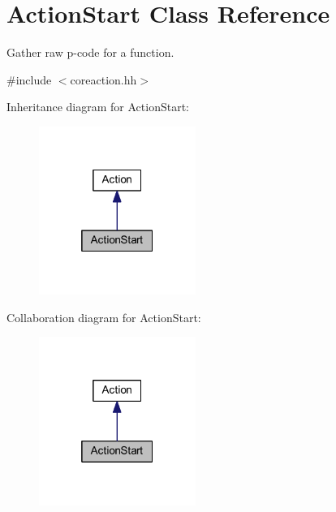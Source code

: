 \hypertarget{class_action_start}{}\section{Action\+Start Class Reference}
\label{class_action_start}


Gather raw p-\/code for a function.  




{\ttfamily \#include $<$coreaction.\+hh$>$}



Inheritance diagram for Action\+Start\+:
\nopagebreak
\begin{figure}[H]
\begin{center}
\leavevmode
\includegraphics[width=145pt]{class_action_start__inherit__graph}
\end{center}
\end{figure}


Collaboration diagram for Action\+Start\+:
\nopagebreak
\begin{figure}[H]
\begin{center}
\leavevmode
\includegraphics[width=145pt]{class_action_start__coll__graph}
\end{center}
\end{figure}
